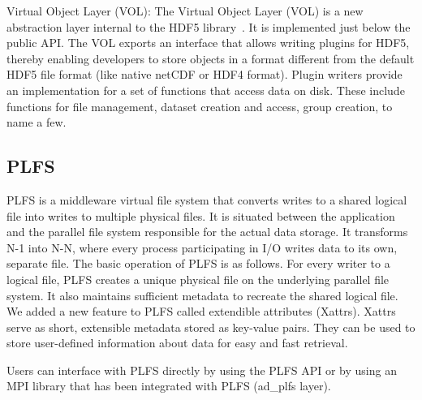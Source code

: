 
Virtual Object Layer (VOL):
The Virtual Object Layer (VOL) is a new abstraction layer internal to the HDF5 library~\cite{vol}. It is implemented just below the public API. The VOL exports an interface that allows writing plugins for HDF5, thereby enabling developers to store objects in a format different from the default HDF5 file format (like native netCDF or HDF4 format). Plugin writers provide an implementation for a set of functions that access data on disk. These include functions for file management, dataset creation and access, group creation, to name a few.

\subsection{PLFS}
PLFS is a middleware virtual file system that converts writes to a shared logical file into writes to multiple physical files. 
It is situated between the application and the parallel file system responsible for the actual data storage. 
It transforms N-1 into N-N, where every process participating in I/O writes data to its own, separate file. 
The basic operation of PLFS is as follows. For every writer to a logical file, PLFS creates a unique physical file on the underlying parallel file system. 
It also maintains sufficient metadata to recreate the shared logical file. 
We added a new feature to PLFS called extendible attributes (Xattrs). Xattrs serve as short, extensible metadata stored as key-value pairs.
They can be used to store user-defined information about data for easy and fast retrieval. 

Users can interface with PLFS directly by using the PLFS API or by using an MPI library that has been integrated with PLFS (ad\_plfs layer).  




